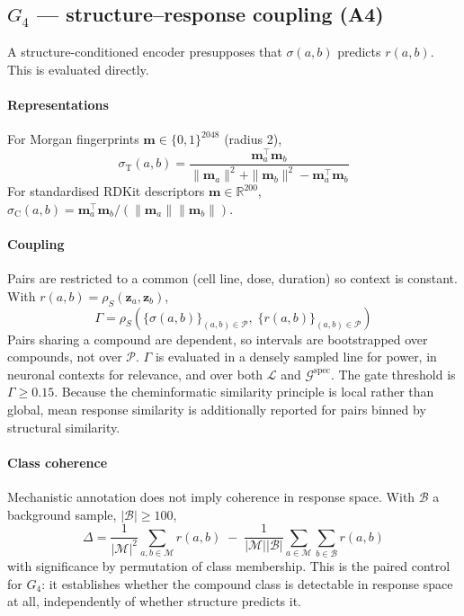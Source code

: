 \documentclass[5p,times,twocolumn]{elsarticle}
\begin{document}
\subsection{\textbf{$G_4$ --- structure--response coupling (A4)}}
\label{sec:d1}

A structure-conditioned encoder presupposes that $\sigma(a,b)$ predicts
$r(a,b)$. This is evaluated directly.

\paragraph{\textbf{Representations}} For Morgan fingerprints
$\mathbf{m}\in\{0,1\}^{2048}$ (radius 2),
\begin{equation}
\sigma_{\mathrm{T}}(a,b)=
\frac{\mathbf{m}_a^{\top}\mathbf{m}_b}
{\|\mathbf{m}_a\|^2+\|\mathbf{m}_b\|^2-\mathbf{m}_a^{\top}\mathbf{m}_b}
\end{equation}
For standardised RDKit descriptors $\mathbf{m}\in\mathbb{R}^{200}$,
$\sigma_{\mathrm{C}}(a,b)=\mathbf{m}_a^{\top}\mathbf{m}_b/
(\|\mathbf{m}_a\|\|\mathbf{m}_b\|)$.

\paragraph{\textbf{Coupling}} Pairs are restricted to a common (cell line, dose,
duration) so context is constant. With
$r(a,b)=\rho_S(\mathbf{z}_a,\mathbf{z}_b)$,
\begin{equation}
\Gamma = \rho_S\!\left(
\{\sigma(a,b)\}_{(a,b)\in\mathcal{P}},\;
\{r(a,b)\}_{(a,b)\in\mathcal{P}}\right)
\end{equation}
Pairs sharing a compound are dependent, so intervals are bootstrapped over
compounds, not over $\mathcal{P}$. $\Gamma$ is evaluated in a densely sampled
line for power, in neuronal contexts for relevance, and over both $\mathcal{L}$
and $\mathcal{G}^{\mathrm{spec}}$. The gate threshold is $\Gamma \geq 0.15$.
Because the cheminformatic similarity principle is local rather than global,
mean response similarity is additionally reported for pairs binned by structural
similarity.

\paragraph{\textbf{Class coherence}} Mechanistic annotation does not imply
coherence in response space. With $\mathcal{B}$ a background sample,
$|\mathcal{B}|\geq 100$,
\begin{equation}
\Delta = \frac{1}{|\mathcal{M}|^2}\!\!\sum_{a,b\in\mathcal{M}}\!\! r(a,b)
\;-\;
\frac{1}{|\mathcal{M}||\mathcal{B}|}\!\!\sum_{a\in\mathcal{M}}
\sum_{b\in\mathcal{B}}\!\! r(a,b)
\end{equation}
with significance by permutation of class membership. This is the paired control
for $G_4$: it establishes whether the compound class is detectable in response
space at all, independently of whether structure predicts it.
\end{document}
